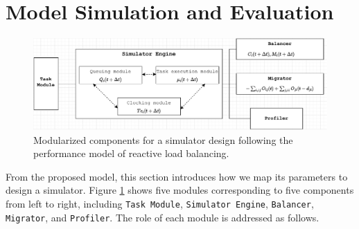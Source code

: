 \section{Model Simulation and Evaluation}
\label{sec:Model-Simulation-Evaluation}

\begin{figure}[t]
  \centering
  \includegraphics[scale=0.625]{./pictures/perf_analysis_model/perf_modularized_components_for_simulation_design.pdf}
	\caption{Modularized components for a simulator design following the performance model of reactive load balancing.}
	\label{fig:react_lb_sim_design}
\end{figure}

From the proposed model, this section introduces how we map its parameters to design a simulator. Figure \ref{fig:react_lb_sim_design} shows five modules corresponding to five components from left to right, including \texttt{Task Module}, \texttt{Simulator Engine}, \texttt{Balancer}, \texttt{Migrator}, and \texttt{Profiler}. The role of each module is addressed as follows.

